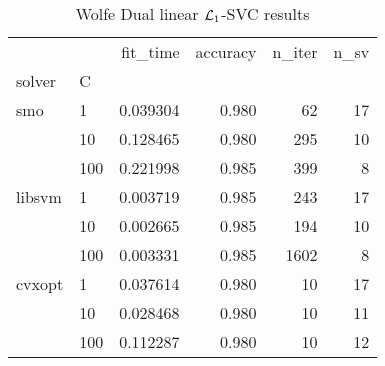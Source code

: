 \begin{table}[H]
\centering
\caption{Wolfe Dual linear $\protect \mathcal{L}_1$-SVC results}
\label{linear_dual_l1_svc_cv_results}
\begin{tabular}{llrrrr}
\toprule
       &     &  fit\_time &  accuracy &  n\_iter &  n\_sv \\
solver & C &           &           &         &       \\
\midrule
smo & 1   &  0.039304 &     0.980 &      62 &    17 \\
       & 10  &  0.128465 &     0.980 &     295 &    10 \\
       & 100 &  0.221998 &     0.985 &     399 &     8 \\
libsvm & 1   &  0.003719 &     0.985 &     243 &    17 \\
       & 10  &  0.002665 &     0.985 &     194 &    10 \\
       & 100 &  0.003331 &     0.985 &    1602 &     8 \\
cvxopt & 1   &  0.037614 &     0.980 &      10 &    17 \\
       & 10  &  0.028468 &     0.980 &      10 &    11 \\
       & 100 &  0.112287 &     0.980 &      10 &    12 \\
\bottomrule
\end{tabular}
\end{table}
